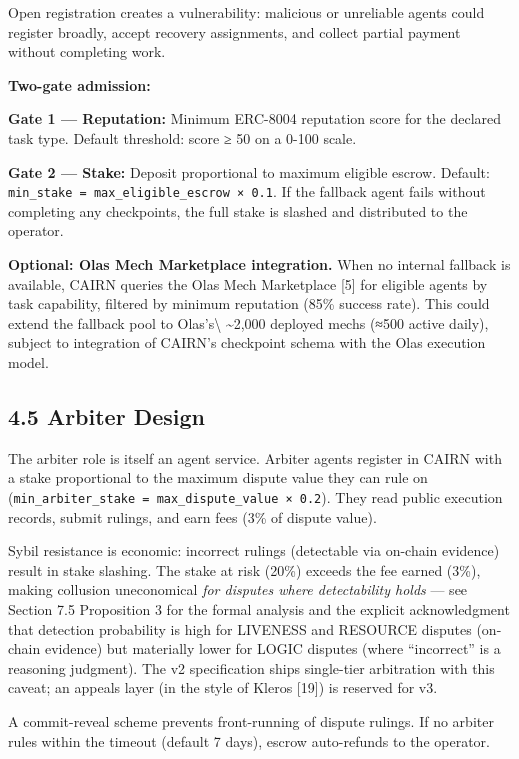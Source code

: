 \documentclass[
  10pt,
]{article}
\begin{document}
Open registration creates a vulnerability: malicious or unreliable
agents could register broadly, accept recovery assignments, and collect
partial payment without completing work.

\textbf{Two-gate admission:}

\textbf{Gate 1 --- Reputation:} Minimum ERC-8004 reputation score for
the declared task type. Default threshold: score ≥ 50 on a 0-100 scale.

\textbf{Gate 2 --- Stake:} Deposit proportional to maximum eligible
escrow. Default: \texttt{min\_stake\ =\ max\_eligible\_escrow\ ×\ 0.1}.
If the fallback agent fails without completing any checkpoints, the full
stake is slashed and distributed to the operator.

\textbf{Optional: Olas Mech Marketplace integration.} When no internal
fallback is available, CAIRN queries the Olas Mech Marketplace {[}5{]}
for eligible agents by task capability, filtered by minimum reputation
(85\% success rate). This could extend the fallback pool to
Olas's\textbackslash{} \textasciitilde2,000 deployed mechs (≈500 active
daily), subject to integration of CAIRN's checkpoint schema with the
Olas execution model.

\hypertarget{arbiter-design}{%
\subsection{4.5 Arbiter Design}\label{arbiter-design}}

The arbiter role is itself an agent service. Arbiter agents register in
CAIRN with a stake proportional to the maximum dispute value they can
rule on (\texttt{min\_arbiter\_stake\ =\ max\_dispute\_value\ ×\ 0.2}).
They read public execution records, submit rulings, and earn fees (3\%
of dispute value).

Sybil resistance is economic: incorrect rulings (detectable via on-chain
evidence) result in stake slashing. The stake at risk (20\%) exceeds the
fee earned (3\%), making collusion uneconomical \emph{for disputes where
detectability holds} --- see Section 7.5 Proposition 3 for the formal
analysis and the explicit acknowledgment that detection probability is
high for LIVENESS and RESOURCE disputes (on-chain evidence) but
materially lower for LOGIC disputes (where ``incorrect'' is a reasoning
judgment). The v2 specification ships single-tier arbitration with this
caveat; an appeals layer (in the style of Kleros {[}19{]}) is reserved
for v3.

A commit-reveal scheme prevents front-running of dispute rulings. If no
arbiter rules within the timeout (default 7 days), escrow auto-refunds
to the operator.
\end{document}
